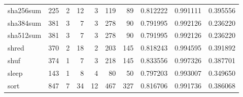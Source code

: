 \begin{longtable}{lrrrrrrrrr}
sha256sum &                    225 &                                  2 &                                12 &                                3 &                               119 &                              89 &                                0.812222 &                               0.991111 &                             0.395556 \\
sha384sum &                    381 &                                  3 &                                 7 &                                3 &                               278 &                              90 &                                0.791995 &                               0.992126 &                             0.236220 \\
sha512sum &                    381 &                                  3 &                                 7 &                                3 &                               278 &                              90 &                                0.791995 &                               0.992126 &                             0.236220 \\
shred     &                    370 &                                  2 &                                18 &                                2 &                               203 &                             145 &                                0.818243 &                               0.994595 &                             0.391892 \\
shuf      &                    374 &                                  1 &                                 7 &                                3 &                               218 &                             145 &                                0.833556 &                               0.997326 &                             0.387701 \\
sleep     &                    143 &                                  1 &                                 8 &                                4 &                                80 &                              50 &                                0.797203 &                               0.993007 &                             0.349650 \\
sort      &                    847 &                                  7 &                                34 &                               12 &                               467 &                             327 &                                0.816706 &                               0.991736 &                             0.386068 \\

\end{longtable}
